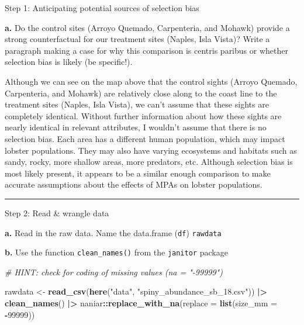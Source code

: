 \documentclass[
]{article}
\newenvironment{Shaded}{\begin{snugshade}}{\end{snugshade}}
\newcommand{\AttributeTok}[1]{\textcolor[rgb]{0.13,0.29,0.53}{#1}}
\newcommand{\CommentTok}[1]{\textcolor[rgb]{0.56,0.35,0.01}{\textit{#1}}}
\newcommand{\DecValTok}[1]{\textcolor[rgb]{0.00,0.00,0.81}{#1}}
\newcommand{\FunctionTok}[1]{\textcolor[rgb]{0.13,0.29,0.53}{\textbf{#1}}}
\newcommand{\NormalTok}[1]{#1}
\newcommand{\OtherTok}[1]{\textcolor[rgb]{0.56,0.35,0.01}{#1}}
\newcommand{\SpecialCharTok}[1]{\textcolor[rgb]{0.81,0.36,0.00}{\textbf{#1}}}
\newcommand{\StringTok}[1]{\textcolor[rgb]{0.31,0.60,0.02}{#1}}
\begin{document}
Step 1: Anticipating potential sources of selection bias

\textbf{a.} Do the control sites (Arroyo Quemado, Carpenteria, and
Mohawk) provide a strong counterfactual for our treatment sites (Naples,
Isla Vista)? Write a paragraph making a case for why this comparison is
centris paribus or whether selection bias is likely (be specific!).

Although we can see on the map above that the control sights (Arroyo
Quemado, Carpenteria, and Mohawk) are relatively close along to the
coast line to the treatment sites (Naples, Isla Vista), we can't assume
that these sights are completely identical. Without further information
about how these sights are nearly identical in relevant attributes, I
wouldn't assume that there is no selection bias. Each area has a
different human population, which may impact lobster populations. They
may also have varying ecosystems and habitats such as sandy, rocky, more
shallow areas, more predators, etc. Although selection bias is most
likely present, it appears to be a similar enough comparison to make
accurate assumptions about the effects of MPAs on lobster populations.

\begin{center}\rule{0.5\linewidth}{0.5pt}\end{center}

Step 2: Read \& wrangle data

\textbf{a.} Read in the raw data. Name the data.frame (\texttt{df})
\texttt{rawdata}

\textbf{b.} Use the function \texttt{clean\_names()} from the
\texttt{janitor} package

\begin{Shaded}
\begin{Highlighting}[]
\CommentTok{\# HINT: check for coding of missing values (\textasciigrave{}na = "{-}99999"\textasciigrave{})}

\NormalTok{rawdata }\OtherTok{\textless{}{-}} \FunctionTok{read\_csv}\NormalTok{(}\FunctionTok{here}\NormalTok{(}\StringTok{"data"}\NormalTok{, }\StringTok{"spiny\_abundance\_sb\_18.csv"}\NormalTok{)) }\SpecialCharTok{|\textgreater{}} 
    \FunctionTok{clean\_names}\NormalTok{() }\SpecialCharTok{|\textgreater{}} 
\NormalTok{    naniar}\SpecialCharTok{::}\FunctionTok{replace\_with\_na}\NormalTok{(}\AttributeTok{replace =} \FunctionTok{list}\NormalTok{(}\AttributeTok{size\_mm =} \SpecialCharTok{{-}}\DecValTok{99999}\NormalTok{))}
\end{Highlighting}
\end{Shaded}
\end{document}
